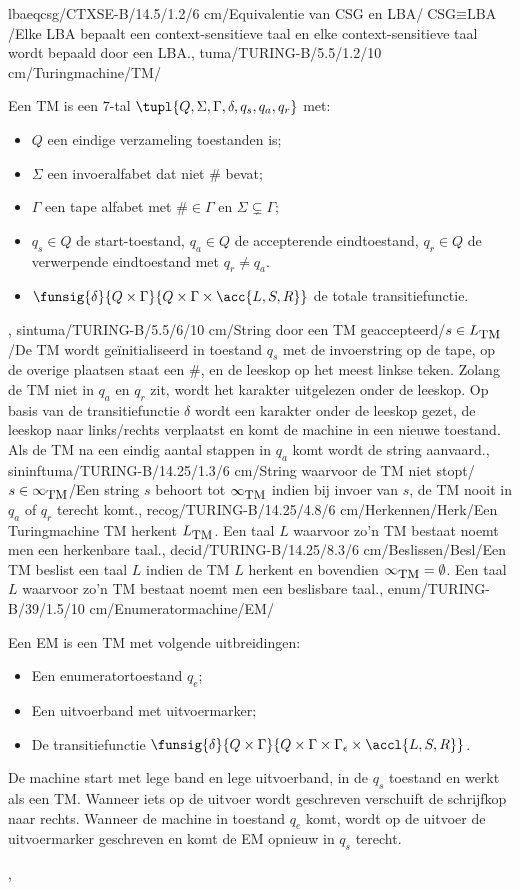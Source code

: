 lbaeqcsg/CTXSE-B/14.5/1.2/6 cm/Equivalentie van CSG en LBA/$\mbox{CSG}\equiv\mbox{LBA}$/{Elke LBA bepaalt een context-sensitieve taal en elke context-sensitieve taal wordt bepaald door een LBA.},
tuma/TURING-B/5.5/1.2/10 cm/Turingmachine/TM/{Een TM is een $7$-tal $\tupl{Q,\Sigma,\Gamma,\delta,q_s,q_a,q_r}$ met:\begin{itemize}\item $Q$ een eindige verzameling toestanden is;\item $\Sigma$ een invoeralfabet dat niet $\#$ bevat;\item $\Gamma$ een tape alfabet met $\#\in\Gamma$ en $\Sigma\subsetneq\Gamma$;\item $q_s\in Q$ de start-toestand, $q_a\in Q$ de accepterende eindtoestand, $q_r\in Q$ de verwerpende eindtoestand met $q_r\neq q_a$.\item $\funsig{\delta}{Q\times\Gamma}{Q\times\Gamma\times\acc{L,S,R}}$ de totale transitiefunctie.\end{itemize}},
sintuma/TURING-B/5.5/6/10 cm/String door een TM geaccepteerd/$s\in L_{\mbox{\small TM}}$/{De TM wordt ge\"initialiseerd in toestand $q_s$ met de invoerstring op de tape, op de overige plaatsen staat een $\#$, en de leeskop op het meest linkse teken. Zolang de TM niet in $q_a$ en $q_r$ zit, wordt het karakter uitgelezen onder de leeskop. Op basis van de transitiefunctie $\delta$ wordt een karakter onder de leeskop gezet, de leeskop naar links/rechts verplaatst en komt de machine in een nieuwe toestand. Als de TM na een eindig aantal stappen in $q_a$ komt wordt de string aanvaard.},
sininftuma/TURING-B/14.25/1.3/6 cm/String waarvoor de TM niet stopt/$s\in\infty_{\mbox{\small TM}}$/{Een string $s$ behoort tot $\infty_{\mbox{\small TM}}$ indien bij invoer van $s$, de TM nooit in $q_a$ of $q_r$ terecht komt.},
recog/TURING-B/14.25/4.8/6 cm/Herkennen/Herk/{Een Turingmachine TM herkent $L_{\mbox{\small TM}}$. Een taal $L$ waarvoor zo'n TM bestaat noemt men een herkenbare taal.},
decid/TURING-B/14.25/8.3/6 cm/Beslissen/Besl/{Een TM beslist een taal $L$ indien de TM $L$ herkent en bovendien $\infty_{\mbox{\small TM}}=\emptyset$. Een taal $L$ waarvoor zo'n TM bestaat noemt men een beslisbare taal.},
enum/TURING-B/39/1.5/10 cm/Enumeratormachine/EM/{Een EM is een TM met volgende uitbreidingen:\begin{itemize}\item Een enumeratortoestand $q_e$;\item Een uitvoerband met uitvoermarker;\item De transitiefunctie $\funsig{\delta}{Q\times\Gamma}{Q\times\Gamma\times\Gamma_{\epsilon}\times\accl{L,S,R}}$.\end{itemize}De machine start met lege band en lege uitvoerband, in de $q_s$ toestand en werkt als een TM. Wanneer iets op de uitvoer wordt geschreven verschuift de schrijfkop naar rechts. Wanneer de machine in toestand $q_e$ komt, wordt op de uitvoer de uitvoermarker geschreven en komt de EM opnieuw in $q_s$ terecht.},
